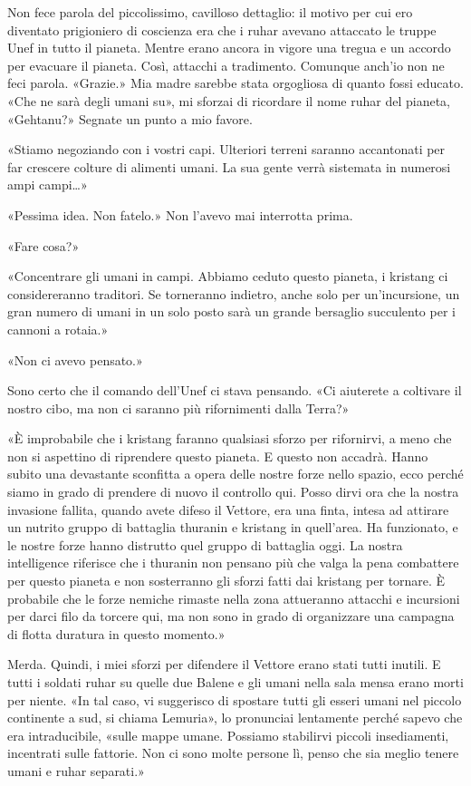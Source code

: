 Non fece parola del piccolissimo, cavilloso dettaglio: il motivo per cui
ero diventato prigioniero di coscienza era che i ruhar avevano attaccato
le truppe Unef in tutto il pianeta. Mentre erano ancora in vigore una
tregua e un accordo per evacuare il pianeta. Così, attacchi a
tradimento. Comunque anch'io non ne feci parola. «Grazie.» Mia madre
sarebbe stata orgogliosa di quanto fossi educato. «Che ne sarà degli
umani su», mi sforzai di ricordare il nome ruhar del pianeta, «Gehtanu?»
Segnate un punto a mio favore.

«Stiamo negoziando con i vostri capi. Ulteriori terreni saranno
accantonati per far crescere colture di alimenti umani. La sua gente
verrà sistemata in numerosi ampi campi\ldots»

«Pessima idea. Non fatelo.» Non l'avevo mai interrotta prima.

«Fare cosa?»

«Concentrare gli umani in campi. Abbiamo ceduto questo pianeta, i
kristang ci considereranno traditori. Se torneranno indietro, anche solo
per un'incursione, un gran numero di umani in un solo posto sarà un
grande bersaglio succulento per i cannoni a rotaia.»

«Non ci avevo pensato.»

Sono certo che il comando dell'Unef ci stava pensando. «Ci aiuterete a
coltivare il nostro cibo, ma non ci saranno più rifornimenti dalla
Terra?»

«È improbabile che i kristang faranno qualsiasi sforzo per rifornirvi, a
meno che non si aspettino di riprendere questo pianeta. E questo non
accadrà. Hanno subito una devastante sconfitta a opera delle nostre
forze nello spazio, ecco perché siamo in grado di prendere di nuovo il
controllo qui. Posso dirvi ora che la nostra invasione fallita, quando
avete difeso il Vettore, era una finta, intesa ad attirare un nutrito
gruppo di battaglia thuranin e kristang in quell'area. Ha funzionato, e
le nostre forze hanno distrutto quel gruppo di battaglia oggi. La nostra
intelligence riferisce che i thuranin non pensano più che valga la pena
combattere per questo pianeta e non sosterranno gli sforzi fatti dai
kristang per tornare. È probabile che le forze nemiche rimaste nella
zona attueranno attacchi e incursioni per darci filo da torcere qui, ma
non sono in grado di organizzare una campagna di flotta duratura in
questo momento.»

Merda. Quindi, i miei sforzi per difendere il Vettore erano stati tutti
inutili. E tutti i soldati ruhar su quelle due Balene e gli umani nella
sala mensa erano morti per niente. «In tal caso, vi suggerisco di
spostare tutti gli esseri umani nel piccolo continente a sud, si chiama
Lemuria», lo pronunciai lentamente perché sapevo che era intraducibile,
«sulle mappe umane. Possiamo stabilirvi piccoli insediamenti, incentrati
sulle fattorie. Non ci sono molte persone lì, penso che sia meglio
tenere umani e ruhar separati.»

